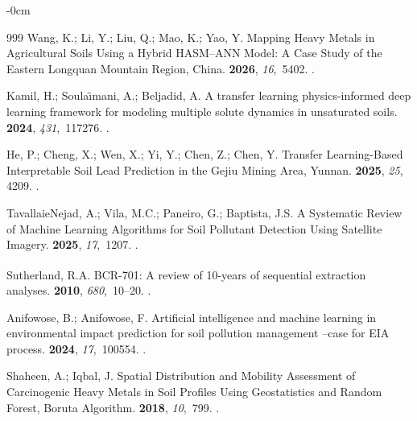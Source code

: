 \documentclass[environremediat,article,accept,pdftex,oneauthor]{Definitions/mdpi}
\begin{document}
\begin{adjustwidth}{-\extralength}{0cm}
\begin{thebibliography}{999}
Wang, K.; Li, Y.; Liu, Q.; Mao, K.; Yao, Y.
\newblock Mapping Heavy Metals in Agricultural Soils Using a Hybrid HASM--ANN
  Model: A Case Study of the Eastern Longquan Mountain Region, China.
 {\bf 2026}, {\em 16},~5402.
.

Kamil, H.; Soula{\"\i}mani, A.; Beljadid, A.
\newblock A transfer learning physics-informed deep learning framework for
  modeling multiple solute dynamics in unsaturated soils.
 {\bf
  2024}, {\em 431},~117276.
.

He, P.; Cheng, X.; Wen, X.; Yi, Y.; Chen, Z.; Chen, Y.
\newblock Transfer Learning-Based Interpretable Soil Lead Prediction in the
  Gejiu Mining Area, Yunnan.
 {\bf 2025}, {\em 25}, 4209.
.

TavallaieNejad, A.; Vila, M.C.; Paneiro, G.; Baptista, J.S.
\newblock A Systematic Review of Machine Learning Algorithms for Soil Pollutant
  Detection Using Satellite Imagery.
 {\bf 2025}, {\em 17},~1207.
.

Sutherland, R.A.
\newblock BCR\textsuperscript{\textregistered}-701: A review of 10-years of
  sequential extraction analyses.
 {\bf 2010}, {\em 680},~10--20.
.

Anifowose, B.; Anifowose, F.
\newblock Artificial intelligence and machine learning in environmental impact
  prediction for soil pollution management --case for EIA process.
 {\bf 2024}, {\em 17},~100554.
.

Shaheen, A.; Iqbal, J.
\newblock Spatial Distribution and Mobility Assessment of Carcinogenic Heavy
  Metals in Soil Profiles Using Geostatistics and Random Forest, Boruta
  Algorithm.
 {\bf 2018}, {\em 10},~799.
.


\end{thebibliography}
\end{adjustwidth}
\end{document}
